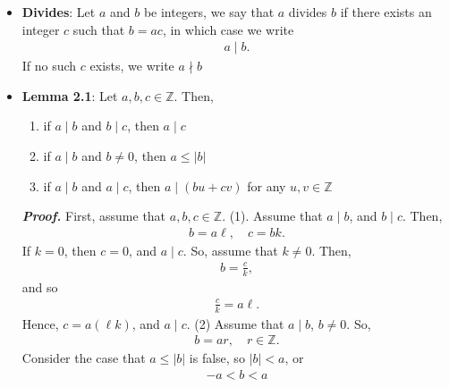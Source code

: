 \documentclass{report}
\begin{document}
\begin{itemize}
            \begin{align*}
                b(q_{1} - q_{2}) = b(0) = r_{2} - r_{2}
            .\end{align*}
            Thus, $r_{1} = r_{2}$. $\endpf$.
        \item \textbf{Divides}: Let $a$ and $b$ be integers, we say that $a$ divides $b$ if there exists an integer $c$ such that $b = ac$, in which case we write
            \begin{align*}
                a \mid b
            .\end{align*}
            If no such $c$ exists, we write $a \nmid b $
        \item \textbf{Lemma 2.1}: Let $a,b,c \in \mathbb{Z}$. Then,
            \begin{enumerate}
                \item if $a \mid b$ and $b \mid c$, then $a \mid c$
                \item if $a \mid b$ and $b \ne 0$, then $a \leq \left\lvert b \right\rvert $
                \item if $a\mid b$ and $a\mid c$, then $a \mid (bu + cv)$ for any $u,v \in \mathbb{Z}$
            \end{enumerate}
            \bigbreak \noindent 
            \textbf{\textit{Proof.}} First, assume that $a,b,c \in \mathbb{Z}$. 
            (1). Assume that $a \mid b$, and  $b \mid c$. Then,
            \begin{align*}
                b = a\ell, \quad c = bk
            .\end{align*}
            If $k =0$, then $c = 0$, and $a \mid c$. So, assume that $ k \ne 0$. Then,
            \begin{align*}
                b = \frac{c}{k}
            ,\end{align*}
            and so 
            \begin{align*}
                \frac{c}{k} = a\ell
            .\end{align*}
            Hence, $c = a(\ell k)$, and $a \mid c$.
            \bigbreak \noindent 
            (2) Assume that $a \mid b$, $b \ne 0$. So,
            \begin{align*}
                b = ar, \quad r \in \mathbb{Z}
            .\end{align*}
            Consider the case that $a \leq \left\lvert b \right\rvert$ is false, so $\left\lvert b \right\rvert < a$, or
            \begin{align*}
                -a < b < a

\end{align*}
\end{itemize}
\end{document}
